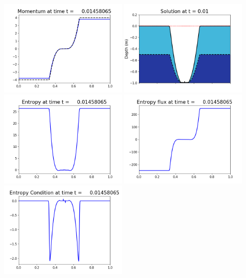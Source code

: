\documentclass[11pt]{article}
\begin{document}
\vskip 10pt 
\includegraphics[width=0.475\textwidth]{frame0091fig1003.png}
\includegraphics[width=0.475\textwidth]{frame0091fig1006.png}
\vskip 10pt 
\includegraphics[width=0.475\textwidth]{frame0091fig1007.png}
\includegraphics[width=0.475\textwidth]{frame0091fig1008.png}
\vskip 10pt 
\includegraphics[width=0.475\textwidth]{frame0091fig1009.png}
\end{document}
